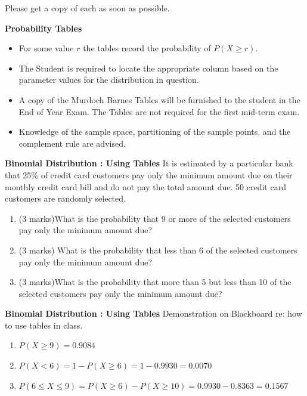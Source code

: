 {{Please get a copy of each as soon as possible.

}

{
\textbf{Probability Tables}
\begin{itemize}
\item  For some value $r$ the tables record the probability of $P(X \geq r)$.
\item  The Student is required to locate the appropriate column based on the parameter values for the distribution in question.
\item  A copy of the Murdoch Barnes Tables will be furnished to the student in the End of Year Exam. The Tables are not required for the first mid-term exam.
\item  Knowledge of the sample space, partitioning of the sample points, and the complement rule are advised.
\end{itemize}
}


{
\textbf{Binomial Distribution : Using Tables}
It is estimated by a particular bank that 25\% of credit card customers pay only the minimum amount due on their monthly credit card bill and do not pay the total amount due. 50 credit card customers are randomly selected.
\begin{enumerate}
\item  (3 marks)What is the probability that 9 or more of the selected customers pay only the minimum amount due?
\item  (3 marks) What is the probability that less than 6 of the selected customers pay only the minimum amount due?
\item  (3 marks)What is the probability that more than 5 but less than 10 of the selected customers pay only the minimum amount due?
\end{enumerate}

}

{
\textbf{Binomial Distribution : Using Tables}
Demonstration on Blackboard re: how to use tables in class.
\begin{enumerate}
\item  $P(X \geq 9) = 0.9084$
\item  $P(X < 6) = 1- P(X \geq 6) =1 - 0.9930 = 0.0070$
\item  $P(6 \leq X \leq 9) = P(X \geq 6) - P(X \geq 10) = 0.9930 - 0.8363 = 0.1567$
\end{enumerate}

}}
